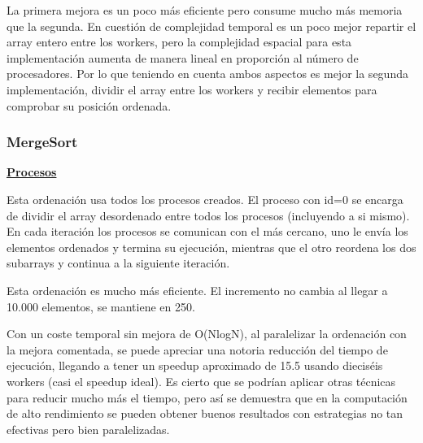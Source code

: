 		La primera mejora es un poco más eficiente pero consume mucho más memoria que la segunda. En cuestión de complejidad temporal es un poco mejor repartir el array entero entre los workers, pero la complejidad espacial para esta implementación aumenta de manera lineal en proporción al número de procesadores. Por lo que teniendo en cuenta ambos aspectos es mejor la segunda implementación, dividir el array entre los workers y recibir elementos para comprobar su posición ordenada.
		
		
		\subsubsection{MergeSort}
		
		\begin{flushleft}
		\begin{mdframed}[roundcorner=5pt]			
			\textbf{\underline{Procesos}}
			\vspace{0.1cm}
			
			\scriptsize	
			Esta ordenación usa todos los procesos creados. El proceso con id=0 se encarga de dividir el array desordenado entre todos los procesos (incluyendo a si mismo). En cada iteración los procesos se comunican con el más cercano, uno le envía los elementos ordenados y termina su ejecución, mientras que el otro reordena los dos subarrays y continua a la siguiente iteración.
		
		\end{mdframed}
		\end{flushleft}		
		
		\begin{tcolorbox}[boxrule=0.5pt, fontupper=\small]
			\scriptsize
			Esta ordenación es mucho más eficiente. El incremento no cambia al llegar a 10.000 elementos, se mantiene en 250.		
		\end{tcolorbox}
		
		\vspace*{-0.2cm}
		
		Con un coste temporal sin mejora de O(NlogN), al paralelizar la ordenación con la mejora comentada, se puede apreciar una notoria reducción del tiempo de ejecución, llegando a tener un speedup aproximado de 15.5 usando dieciséis workers (casi el speedup ideal). Es cierto que se podrían aplicar otras técnicas para reducir mucho más el tiempo, pero así se demuestra que en la computación de alto rendimiento se pueden obtener buenos resultados con estrategias no tan efectivas pero bien paralelizadas.
		
